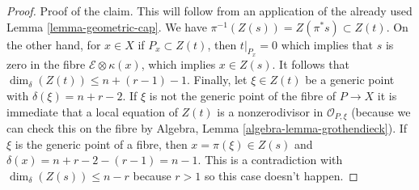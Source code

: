 \begin{proof}
\medskip\noindent
Proof of the claim. This will follow from an application of
the already used Lemma \ref{lemma-geometric-cap}.
We have $\pi^{-1}(Z(s)) = Z(\pi^*s) \subset Z(t)$.
On the other hand, for $x \in X$ if $P_x \subset Z(t)$, then
$t|_{P_x} = 0$ which implies that $s$ is zero in the fibre
$\mathcal{E} \otimes \kappa(x)$, which implies $x \in Z(s)$.
It follows that $\dim_\delta(Z(t)) \leq n + (r - 1) - 1$.
Finally, let $\xi \in Z(t)$ be a generic point with
$\delta(\xi) = n + r - 2$. If $\xi$ is not the generic point
of the fibre of $P \to X$ it is immediate that
a local equation of $Z(t)$ is a nonzerodivisor in $\mathcal{O}_{P, \xi}$
(because we can check this on the fibre by
Algebra, Lemma \ref{algebra-lemma-grothendieck}).
If $\xi$ is the generic point of a fibre, then $x = \pi(\xi) \in Z(s)$
and $\delta(x) = n + r - 2 - (r - 1) = n - 1$. This is a contradiction
with $\dim_\delta(Z(s)) \leq n - r$ because $r > 1$
so this case doesn't happen.
\end{proof}